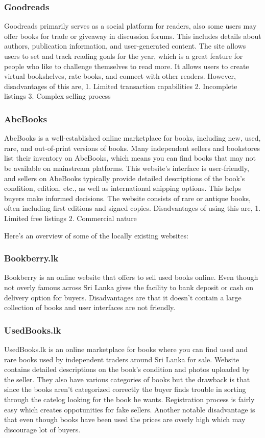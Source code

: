 \documentclass{article}
\begin{document}
\subsubsection{Goodreads}
Goodreads primarily serves as a social platform for readers, also some users may offer books for trade or giveaway in discussion forums. This includes details about authors, publication information, and user-generated content. The site allows users to set and track reading goals for the year, which is a great feature for people who like to challenge themselves to read more. It allows users to create virtual bookshelves, rate books, and connect with other readers. However, disadvantages of this are,
1. Limited transaction capabilities
2. Incomplete listings
3. Complex selling process

\subsubsection{AbeBooks}
AbeBooks is a well-established online marketplace for books, including new, used, rare, and out-of-print versions of books. Many independent sellers and bookstores list their inventory on AbeBooks, which means you can find books that may not be available on mainstream platforms. This website's interface is user-friendly, and sellers on AbeBooks typically provide detailed descriptions of the book's condition, edition, etc., as well as international shipping options. This helps buyers make informed decisions. The website consists of rare or antique books, often including first editions and signed copies. Disadvantages of using this are,
1. Limited free listings
2. Commercial nature

Here's an overview of some of the locally existing websites:

\subsubsection{Bookberry.lk}
Bookberry is an online website that offers to sell used books online. Even though not overly famous across Sri Lanka gives the facility to bank deposit or cash on delivery option for buyers. Disadvantages are that it doesn't contain a large collection of books and user interfaces are not friendly. 

\subsubsection{UsedBooks.lk}
UsedBooks.lk is an online marketplace for books where you can find used and rare books used by independent traders around Sri Lanka for sale.
Website contains detailed descriptions on the book's condition and photos uploaded by the seller. They also have various categories of books but the drawback is that since the books aren't categorized correctly the buyer finds trouble in sorting through the catelog looking for the book he wants. Registration process is fairly easy which creates oppotunities for fake sellers. Another notable disadvantage is that even though books have been used the prices are overly high which may discourage lot of buyers. 
\end{document}
